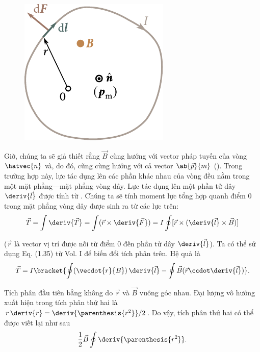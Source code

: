 \begin{figure}[t]
	\begin{center}
		\includegraphics[scale=1]{figures/ch_06/fig_6_15.pdf}
		\caption[]{}
		\label{fig:6_15}
	\end{center}
	\vspace{-0.8cm}
\end{figure}

Giờ, chúng ta sẽ giả thiết rằng $\vec{B}$ cùng hướng với vector pháp tuyến của vòng $\hatvec{n}$ và, do đó, cũng cùng hướng với cả vector $\ab{\vec{p}}{m}$ (). Trong trường hợp này, lực tác dụng lên các phần khác nhau của vòng đều nằm trong một mặt phẳng---mặt phẳng vòng dây. Lực tác dụng lên một phần tử dây $\deriv{\vec{l}}$ được tính từ . Chúng ta sẽ tính moment lực tổng hợp quanh điểm $0$ trong mặt phẳng vòng dây được sinh ra từ các lực trên:
\begin{equation*}
    \vec{T} = \int \deriv{\vec{T}} = \int (\vec{r} \times \deriv{\vec{F}}) = I \oint [\vec{r} \times (\deriv{\vec{l}} \times \vec{B})]
\end{equation*}

\noindent
($\vec{r}$ là vector vị trí được nối từ điểm $0$ đến phần tử dây $\deriv{\vec{l}}$). Ta có thể sử dụng Eq. (1.35) từ Vol. I để biến đổi tích phân trên. Hệ quả là
\begin{equation*}
    \vec{T} = I \bracket{ \oint (\vecdot{r}{B})\, \deriv{\vec{l}} - \oint \vec{B} (\vec{r} \ccdot \deriv{\vec{l}}) }.
\end{equation*}

Tích phân đầu tiên bằng không do $\vec{r}$ và $\vec{B}$ vuông góc nhau. Đại lượng vô hướng xuất hiện trong tích phân thứ hai là $r\,\deriv{r} = \deriv{\parenthesis{r^2}}/2$. Do vậy, tích phân thứ hai có thể được viết lại như sau
\begin{equation*}
    \frac{1}{2} \vec{B} \oint \deriv{\parenthesis{r^2}}.
\end{equation*}

